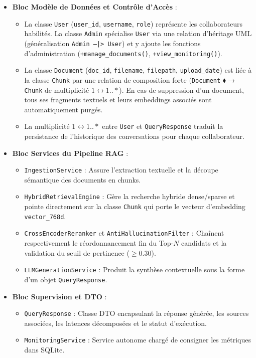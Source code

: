 \begin{itemize}
    \item \textbf{Bloc Modèle de Données et Contrôle d'Accès} :
    \begin{itemize}
        \item La classe \texttt{User} (\texttt{user\_id}, \texttt{username}, \texttt{role}) représente les collaborateurs habilités. La classe \texttt{Admin} spécialise \texttt{User} via une relation d'héritage UML (généralisation \texttt{Admin --|> User}) et y ajoute les fonctions d'administration (\texttt{+manage\_documents()}, \texttt{+view\_monitoring()}).
        \item La classe \texttt{Document} (\texttt{doc\_id}, \texttt{filename}, \texttt{filepath}, \texttt{upload\_date}) est liée à la classe \texttt{Chunk} par une relation de composition forte (\texttt{Document} $\blacklozenge\!\longrightarrow$ \texttt{Chunk} de multiplicité $1 \longleftrightarrow 1..*$). En cas de suppression d'un document, tous ses fragments textuels et leurs embeddings associés sont automatiquement purgés.
        \item La multiplicité $1 \longleftrightarrow 1..*$ entre \texttt{User} et \texttt{QueryResponse} traduit la persistance de l'historique des conversations pour chaque collaborateur.
    \end{itemize}
    \item \textbf{Bloc Services du Pipeline RAG} :
    \begin{itemize}
        \item \texttt{IngestionService} : Assure l'extraction textuelle et la découpe sémantique des documents en chunks.
        \item \texttt{HybridRetrievalEngine} : Gère la recherche hybride dense/sparse et pointe directement sur la classe \texttt{Chunk} qui porte le vecteur d'embedding \texttt{vector\_768d}.
        \item \texttt{CrossEncoderReranker} et \texttt{AntiHallucinationFilter} : Chaînent respectivement le réordonnancement fin du Top-$N$ candidats et la validation du seuil de pertinence ($\ge 0.30$).
        \item \texttt{LLMGenerationService} : Produit la synthèse contextuelle sous la forme d'un objet \texttt{QueryResponse}.
    \end{itemize}
    \item \textbf{Bloc Supervision et DTO} :
    \begin{itemize}
        \item \texttt{QueryResponse} : Classe DTO encapsulant la réponse générée, les sources associées, les latences décomposées et le statut d'exécution.
        \item \texttt{MonitoringService} : Service autonome chargé de consigner les métriques dans SQLite.
    \end{itemize}
\end{itemize}

